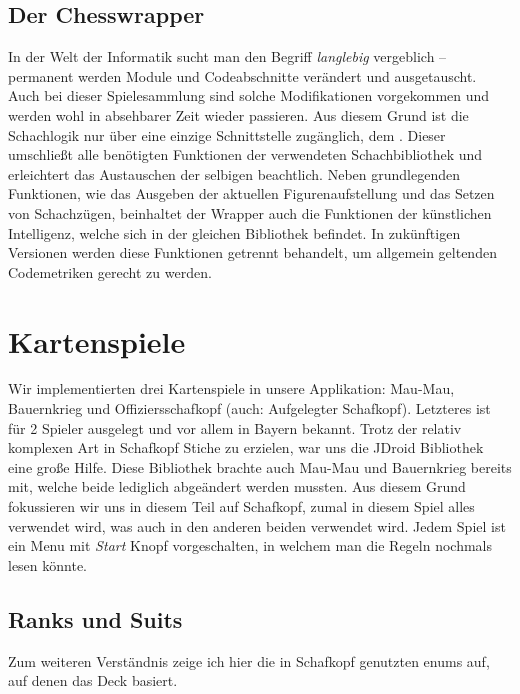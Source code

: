 \subsection{Der Chesswrapper}

In der Welt der Informatik sucht man den Begriff \emph{langlebig} vergeblich --
permanent werden Module und Codeabschnitte verändert und ausgetauscht. Auch bei
dieser Spielesammlung sind solche Modifikationen vorgekommen und werden wohl in
absehbarer Zeit wieder passieren. Aus diesem Grund ist die Schachlogik nur über
eine einzige Schnittstelle zugänglich, dem . Dieser
umschließt alle benötigten Funktionen der verwendeten Schachbibliothek und
erleichtert das Austauschen der selbigen beachtlich. Neben grundlegenden
Funktionen, wie das Ausgeben der aktuellen Figurenaufstellung und das Setzen
von Schachzügen, beinhaltet der Wrapper auch die Funktionen der künstlichen
Intelligenz, welche sich in der gleichen Bibliothek befindet. In zukünftigen
Versionen werden diese Funktionen getrennt behandelt, um allgemein geltenden
Codemetriken gerecht zu werden. 

\section{Kartenspiele}
\sectionauthor{\philipp}

Wir implementierten drei Kartenspiele in unsere Applikation: Mau-Mau,
Bauernkrieg und Offiziersschafkopf (auch: Aufgelegter Schafkopf). Letzteres ist
für 2 Spieler ausgelegt und vor allem in Bayern bekannt. Trotz der relativ
komplexen Art in Schafkopf Stiche zu erzielen, war uns die JDroid Bibliothek
eine große Hilfe. Diese Bibliothek brachte auch Mau-Mau und Bauernkrieg bereits
mit, welche beide lediglich abgeändert werden mussten.  Aus diesem Grund
fokussieren wir uns in diesem Teil auf Schafkopf, zumal in diesem Spiel alles
verwendet wird, was auch in den anderen beiden verwendet wird. Jedem Spiel ist
ein Menu mit \emph{Start} Knopf vorgeschalten, in welchem man die Regeln
nochmals lesen könnte.

\subsection{Ranks und Suits}

Zum weiteren Verständnis zeige ich hier die in Schafkopf genutzten enums auf,
auf denen das Deck basiert.

